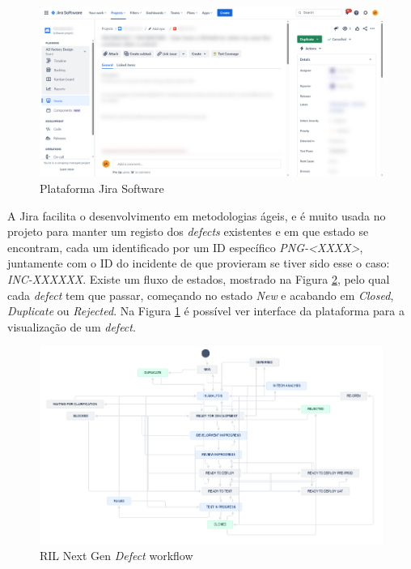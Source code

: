             \begin{figure}[htbp]
                \centering
                \includegraphics[width=\textwidth]{imgs/JiraSoftware.png} 
                \caption{Plataforma Jira Software}\label{fig:jira-ui}
            \end{figure}

            A Jira facilita o desenvolvimento em metodologias ágeis, e é muito usada no projeto para manter um registo dos \textit{defects} existentes e em que estado se encontram, cada um identificado por um ID específico \textit{PNG-<XXXX>}, juntamente com o ID do incidente de que provieram se tiver sido esse o caso: \textit{INC-XXXXXX}. Existe um fluxo de estados, mostrado na Figura \ref{fig:defect-workflow}, pelo qual cada \textit{defect} tem que passar, começando no estado \textit{New} e acabando em \textit{Closed}, \textit{Duplicate} ou \textit{Rejected}. Na Figura \ref{fig:jira-ui} é possível ver interface da plataforma para a visualização de um \textit{defect}.

            \begin{figure}[htbp]
                \centering
                \includegraphics[width=\textwidth]{imgs/NextGenDefectWorkflow.png}
                \caption{RIL Next Gen \textit{Defect} workflow}\label{fig:defect-workflow}
            \end{figure}

